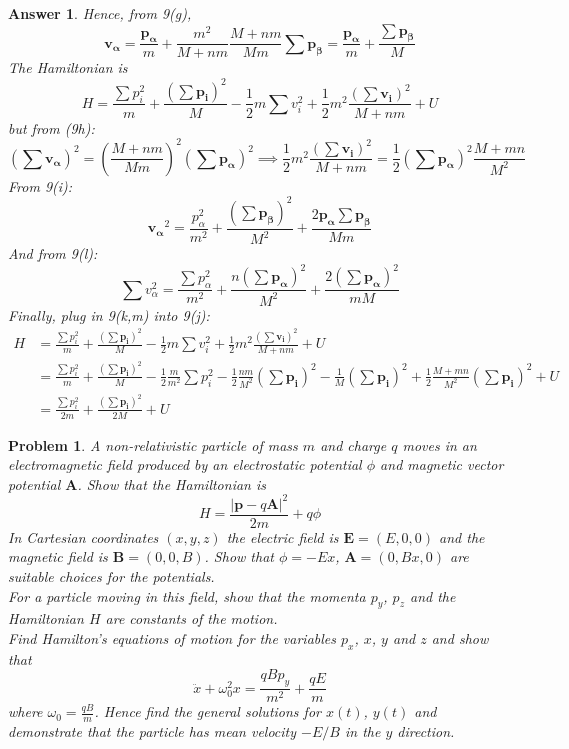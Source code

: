\documentclass[a4paper]{article}
\newtheorem{ans}{Answer}[section]
\theoremstyle{new}
\newtheorem{qns}{Problem}[section]
\begin{document}
\begin{ans}
Hence, from 9(g),
\begin{equation}
\mathbf{v_\alpha}=\frac{\mathbf{p_\alpha}}{m}+\frac{m^2}{M+nm}\frac{M+nm}{Mm}\sum\mathbf{p_\beta}=\frac{\mathbf{p_\alpha}}{m}+\frac{\sum\mathbf{p_\beta}}{M}\tag{9i}
\end{equation}
The Hamiltonian is
\begin{equation}
H=\frac{\sum p_i^2}{m}+\frac{(\sum\mathbf{p_i})^2}{M}-\frac{1}{2}m\sum v_i^2+\frac{1}{2}m^2\frac{(\sum \mathbf{v_i})^2}{M+nm}+U\tag{9j}
\end{equation}
but from (9h):
\begin{equation}
(\sum\mathbf{v_\alpha})^2=(\frac{M+nm}{Mm})^2(\sum\mathbf{p_\alpha})^2\implies\frac{1}{2}m^2\frac{(\sum\mathbf{v_i})^2}{M+nm}=\frac{1}{2}(\sum\mathbf{p_\alpha})^2\frac{M+mn}{M^2}\tag{9k}
\end{equation}
From 9(i):
\begin{equation}
\mathbf{v_\alpha}^2=\frac{p_\alpha^2}{m^2}+\frac{(\sum\mathbf{p_\beta})^2}{M^2}+\frac{2\mathbf{p_\alpha}\sum\mathbf{p_\beta}}{Mm}\tag{9l}
\end{equation}
And from 9(l): 
\begin{equation}
\sum v_\alpha^2=\frac{\sum p_\alpha^2}{m^2}+\frac{n(\sum \mathbf{p_\alpha})^2}{M^2}+\frac{2(\sum \mathbf{p_\alpha})^2}{mM}\tag{9m}
\end{equation}
Finally, plug in 9(k,m) into 9(j):
\begin{align}
    H&=\frac{\sum p_i^2}{m}+\frac{(\sum\mathbf{p_i})^2}{M}-\frac{1}{2}m\sum v_i^2+\frac{1}{2}m^2\frac{(\sum \mathbf{v_i})^2}{M+nm}+U\nonumber\\&=\frac{\sum p_i^2}{m}+\frac{(\sum\mathbf{p_i})^2}{M}-\frac{1}{2}\frac{m}{m^2}\sum p_i^2-\frac{1}{2}\frac{nm}{M^2}(\sum \mathbf{p_i})^2-\frac{1}{M}(\sum \mathbf{p_i})^2+\frac{1}{2}\frac{M+mn}{M^2}(\sum \mathbf{p_i})^2+U\nonumber\\&=\frac{\sum p_i^2}{2m}+\frac{(\sum \mathbf{p_i})^2}{2M}+U\nonumber
\end{align}
\end{ans}
\newpage
\begin{qns}
A non-relativistic particle of mass $m$ and charge $q$ moves in an electromagnetic field produced by an electrostatic potential $\phi$ and magnetic vector potential $\mathbf{A}$. Show that the Hamiltonian is 
$$H=\frac{|\mathbf{p}-q\mathbf{A}|^2}{2m}+q\phi$$
In Cartesian coordinates $(x,y,z)$ the electric field is $\mathbf{E}=(E,0,0)$ and the magnetic field is $\mathbf{B}=(0,0,B)$. Show that $\phi=-Ex$, $\mathbf{A}=(0,Bx,0)$ are suitable choices for the potentials.\\[5pt]
For a particle moving in this field, show that the momenta $p_y$, $p_z$ and the Hamiltonian $H$ are constants of the motion.\\[5pt]
Find Hamilton’s equations of motion for the variables $p_x$, $x$, $y$ and $z$ and show that
$$\ddot{x}+\omega_0^2x=\frac{qBp_y}{m^2}+\frac{qE}{m}$$
where $\omega_0=\frac{qB}{m}$. Hence find the general solutions for $x(t)$, $y(t)$ and demonstrate that the particle has mean velocity $-E/B$ in the $y$ direction.
\end{qns}
\end{document}
